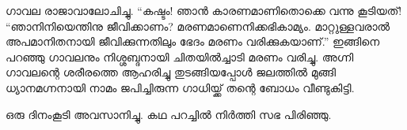 ഗാവല രാജാവാലോചിച്ചു. “കഷ്ടം! ഞാന്‍ കാരണമാണിതൊക്കെ വന്നു കൂടിയത്! “ഞാനിനിയെന്തിനു ജീവിക്കാണം? മരണമാണെനിക്കഭികാമ്യം. മാറ്റുള്ളവരാല്‍ അപമാനിതനായി ജീവിക്കുന്നതിലും ഭേദം മരണം വരിക്കുകയാണ്.” ഇങ്ങിനെ പറഞ്ഞു ഗാവലനും നിശ്ശബ്ദനായി ചിതയില്‍ച്ചാടി മരണം വരിച്ചു. അഗ്നി ഗാവലന്റെ ശരീരത്തെ ആഹരിച്ചു തുടങ്ങിയപ്പോള്‍ ജലത്തില്‍ മുങ്ങി ധ്യാനമഗ്നനായി നാമം ജപിച്ചിരുന്ന ഗാധിയ്ക്ക് തന്റെ ബോധം വീണ്ടുകിട്ടി.

ഒരു ദിനംകൂടി അവസാനിച്ചു. കഥ പറച്ചില്‍ നിര്‍ത്തി സഭ പിരിഞ്ഞു.